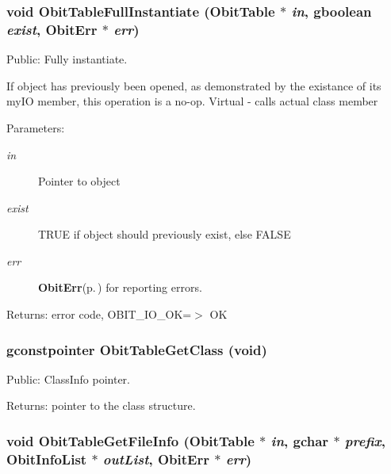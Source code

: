 \subsubsection{\setlength{\rightskip}{0pt plus 5cm}void Obit\-Table\-Full\-Instantiate ({\bf Obit\-Table} $\ast$ {\em in}, gboolean {\em exist}, {\bf Obit\-Err} $\ast$ {\em err})}\label{ObitTable_8h_a31}


Public: Fully instantiate. 

If object has previously been opened, as demonstrated by the existance of its my\-IO member, this operation is a no-op. Virtual - calls actual class member \begin{Desc}
\item[Parameters:]
\begin{description}
\item[{\em in}]Pointer to object \item[{\em exist}]TRUE if object should previously exist, else FALSE \item[{\em err}]{\bf Obit\-Err}{\rm (p.\,\pageref{structObitErr})} for reporting errors. \end{description}
\end{Desc}
\begin{Desc}
\item[Returns:]error code, OBIT\_\-IO\_\-OK=$>$ OK \end{Desc}
\subsubsection{\setlength{\rightskip}{0pt plus 5cm}gconstpointer Obit\-Table\-Get\-Class (void)}\label{ObitTable_8h_a33}


Public: Class\-Info pointer. 

\begin{Desc}
\item[Returns:]pointer to the class structure. \end{Desc}
\subsubsection{\setlength{\rightskip}{0pt plus 5cm}void Obit\-Table\-Get\-File\-Info ({\bf Obit\-Table} $\ast$ {\em in}, gchar $\ast$ {\em prefix}, {\bf Obit\-Info\-List} $\ast$ {\em out\-List}, {\bf Obit\-Err} $\ast$ {\em err})}\label{ObitTable_8h_a49}


